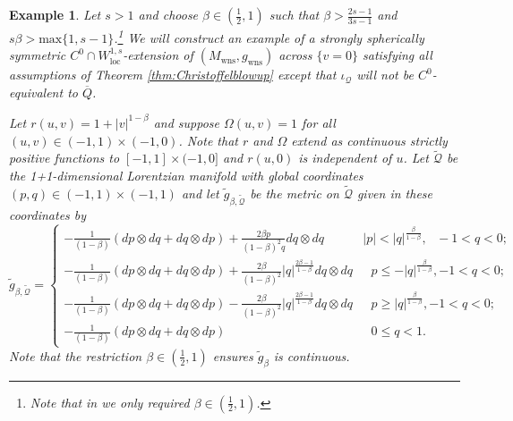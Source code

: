 \documentclass{article}
\newcommand{\Q}{\mathcal{Q}}
\newcommand{\loc}{\mathrm{loc}}
\newcommand{\Mw}{M_{\mathrm{wns}}}
\newcommand{\gw}{g_{\mathrm{wns}}}
\newtheorem{example}[definition]{Example}
\begin{document}
\begin{example}
    Let $s>1$ and choose $\beta\in\left(\frac{1}{2},1\right)$ such that $\beta>\frac{2s-1}{3s-1}$ and $s\beta>\text{max}\{1,s-1\}$.\footnote{Note that in \cite[Example 4.1]{CameronSbierski} we only required $\beta\in\left(\frac{1}{2},1\right)$.} 
   We will construct an example of a strongly spherically symmetric $C^0\cap W^{1,s}_{\loc}$-extension of $(\Mw,\gw)$ across $\{v=0\}$ satisfying all assumptions of Theorem \ref{thm:Christoffelblowup} except that $\iota_{\Q}$ will not be $C^0$-equivalent to $\overline{Q}$. 

Let $r(u,v)=1+|v|^{1-\beta}$ and suppose $\Omega(u,v)=1$ for all $(u,v)\in(-1,1)\times(-1,0)$. Note that $r$ and $\Omega$ extend as continuous strictly positive functions to $[-1,1]\times(-1,0]$ and $r(u,0)$ is independent of $u$. Let $\tilde{\Q}$ be the 1+1-dimensional Lorentzian manifold with global coordinates $(p,q)\in(-1,1)\times(-1,1)$ and let $\tilde{g}_{\beta,\tilde{\Q}}$ be the metric on $\tilde{\Q}$ given in these coordinates by 
    \begin{equation}
        \tilde{g}_{\beta,\tilde{\Q}}=\begin{cases}
            -\frac{1}{(1-\beta)}\left(dp\otimes dq + dq\otimes dp\right)+ \frac{2\beta p}{(1-\beta)^2q}dq\otimes dq & |p| < |q|^{\frac{\beta}{1-\beta}}, \text{ }-1<q<0;\\
            -\frac{1}{(1-\beta)}\left(dp\otimes dq + dq\otimes dp\right) +\frac{2\beta }{(1-\beta)^2}|q|^{\frac{2\beta-1}{1-\beta}}dq\otimes dq & \text{ }p\leq -|q|^{\frac{\beta}{1-\beta}}, -1<q<0;\\
            -\frac{1}{(1-\beta)}\left(dp\otimes dq + dq\otimes dp\right) - \frac{2\beta }{(1-\beta)^2}|q|^{\frac{2\beta-1}{1-\beta}}dq\otimes dq & \text{ }p\geq|q|^{\frac{\beta}{1-\beta}}, -1<q<0;\\
            -\frac{1}{(1-\beta)}\left(dp\otimes dq + dq\otimes dp\right)  & \text{ }0\leq q<1.            
        \end{cases}
    \end{equation}
    Note that the restriction $\beta\in\left(\frac{1}{2},1\right)$ ensures $\tilde{g}_{\beta}$ is continuous. 


\end{example}
\end{document}
